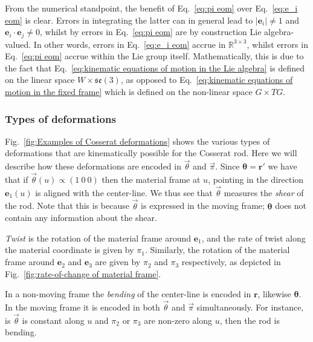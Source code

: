 From the numerical standpoint, the benefit of Eq.~\ref{eq:pi eom} over  Eq.~\ref{eq:e_i eom} is clear. Errors in integrating the latter can in general lead to $|\mathbf{e}_i| \neq 1$ and $\mathbf{e}_i \cdot \mathbf{e}_j \neq 0$, whilst by errors in Eq.~\ref{eq:pi eom} are by construction Lie algebra-valued. In other words, errors in Eq.~\ref{eq:e_i eom} accrue in $\mathbb{R}^{3 \times 3}$, whilst errors in Eq.~\ref{eq:pi eom} accrue within the Lie group itself. Mathematically, this is due to the fact that Eq.~\ref{eq:kinematic equations of motion in the Lie algebra} is defined on the linear space $W \times \mathfrak{se}(3)$, as opposed to Eq.~\ref{eq:kinematic equations of motion in the fixed frame} which is defined on the non-linear space $G \times TG$.

\subsubsection*{Types of deformations} \label{sec:deformation types}

Fig.~\ref{fig:Examples of Cosserat deformations} shows the various types of deformations that are kinematically possible for the Cosserat rod. Here we will describe how these deformations are encoded in $\vec{\theta}$ and $\vec{\pi}$. Since $\boldsymbol{\theta} = \mathbf{r}'$ we have that if $\vec{\theta}(u) \propto (1\ 0\ 0)$ then the material frame at $u$, pointing in the direction $\mathbf{e}_1(u)$ is aligned with the center-line. We thus see that $\vec{\theta}$ measures the \textit{shear} of the rod. Note that this is because $\vec{\theta}$ is expressed in the moving frame; $\boldsymbol{\theta}$ does not contain any information about the shear.

\textit{Twist} is the rotation of the material frame around $\mathbf{e}_1$, and the rate of twist along the material coordinate is given by $\pi_1$. Similarly, the rotation of the material frame around $\mathbf{e}_2$ and $\mathbf{e}_3$ are given by $\pi_2$ and $\pi_3$ respectively, as depicted in Fig.~\ref{fig:rate-of-change of material frame}.

In a non-moving frame the \textit{bending} of the center-line is encoded in $\mathbf{r}$, likewise $\boldsymbol{\theta}$. In the moving frame it is encoded in both $\vec{\theta}$ and $\vec{\pi}$ simultaneously. For instance, is $\vec{\theta}$ is constant along $u$ and $\pi_2$ or $\pi_3$ are non-zero along $u$, then the rod is bending.

